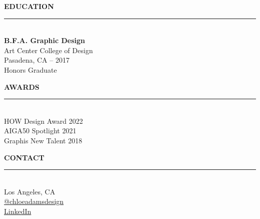 \documentclass[11pt,a4paper]{article}
\begin{document}
\begin{minipage}[t]{0.34\textwidth}
\vspace{6pt}
\noindent\textcolor{accent}{\textbf{EDUCATION}}\\
\rule{\linewidth}{0.4pt}\\[2pt]
\textbf{B.F.A. Graphic Design}\\
Art Center College of Design\\
Pasadena, CA -- 2017\\
Honors Graduate

\vspace{6pt}
\noindent\textcolor{accent}{\textbf{AWARDS}}\\
\rule{\linewidth}{0.4pt}\\[2pt]
HOW Design Award 2022\\
AIGA50 Spotlight 2021\\
Graphis New Talent 2018

\vspace{6pt}
\noindent\textcolor{accent}{\textbf{CONTACT}}\\
\rule{\linewidth}{0.4pt}\\[2pt]
Los Angeles, CA\\
\href{https://instagram.com/chloeadamsdesign}{@chloeadamsdesign}\\
\href{https://linkedin.com/in/chloeadams}{LinkedIn}

\end{minipage}%
\hspace{8pt}
\end{document}

